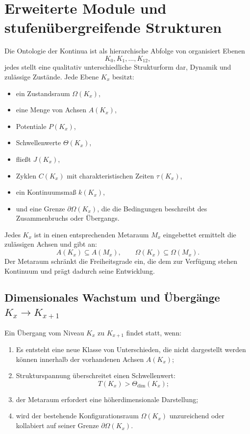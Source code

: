 
\section{Erweiterte Module und stufenübergreifende Strukturen}
\label{sec:klevels-master}

Die Ontologie der Kontinua ist als hierarchische Abfolge von organisiert
Ebenen
\[
K_0, K_1, \dots, K_{12},
\]
jedes stellt eine qualitativ unterschiedliche Strukturform dar,
Dynamik und zulässige Zustände.
Jede Ebene $K_x$ besitzt:
\begin{itemize}
    \item ein Zustandsraum $\Omega(K_x)$,
    \item eine Menge von Achsen $A(K_x)$,
    \item Potentiale $P(K_x)$,
    \item Schwellenwerte $\Theta(K_x)$,
    \item fließt $J(K_x)$,
    \item Zyklen $C(K_x)$ mit charakteristischen Zeiten $\tau(K_x)$,
    \item ein Kontinuumsmaß $k(K_x)$,
    \item und eine Grenze $\partial\Omega(K_x)$, die die Bedingungen beschreibt
          des Zusammenbruchs oder Übergangs.
\end{itemize}

Jedes $K_x$ ist in einen entsprechenden Metaraum $M_x$ eingebettet
ermittelt die zulässigen Achsen und gibt an:
\[
A(K_x) \subseteq A(M_x), \qquad
\Omega(K_x) \subseteq \Omega(M_x).
\]
Der Metaraum schränkt die Freiheitsgrade ein, die dem zur Verfügung stehen
Kontinuum und prägt dadurch seine Entwicklung.


\subsection{Dimensionales Wachstum und Übergänge $K_x \to K_{x+1}$}

Ein Übergang vom Niveau $K_x$ zu $K_{x+1}$ findet statt, wenn:
\begin{enumerate}
    \item Es entsteht eine neue Klasse von Unterschieden, die nicht dargestellt werden können
          innerhalb der vorhandenen Achsen $A(K_x)$;
    \item Strukturspannung überschreitet einen Schwellenwert:
    \[
        T(K_x) > \Theta_{\mathrm{dim}}(K_x);
    \]
    \item der Metaraum erfordert eine höherdimensionale Darstellung;
    \item wird der bestehende Konfigurationsraum $\Omega(K_x)$
          unzureichend oder kollabiert auf seiner Grenze $\partial\Omega(K_x)$.
\end{enumerate}

